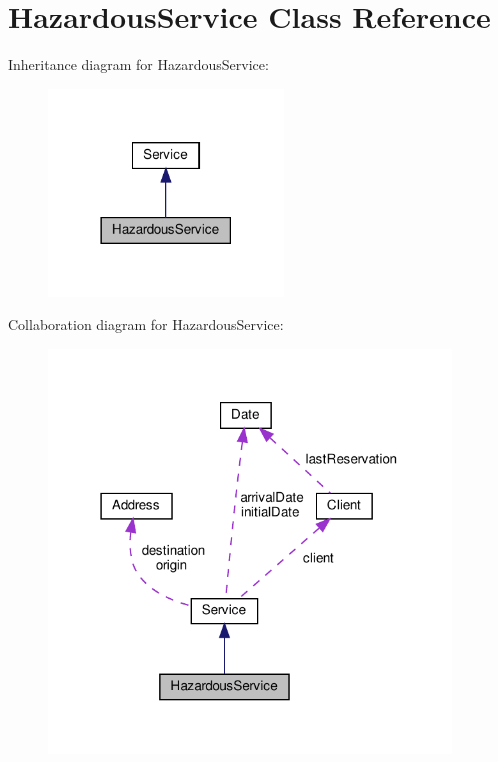 \hypertarget{class_hazardous_service}{}\section{Hazardous\+Service Class Reference}
\label{class_hazardous_service}


Inheritance diagram for Hazardous\+Service\+:\nopagebreak
\begin{figure}[H]
\begin{center}
\leavevmode
\includegraphics[width=177pt]{class_hazardous_service__inherit__graph}
\end{center}
\end{figure}


Collaboration diagram for Hazardous\+Service\+:
\nopagebreak
\begin{figure}[H]
\begin{center}
\leavevmode
\includegraphics[width=303pt]{class_hazardous_service__coll__graph}
\end{center}
\end{figure}

